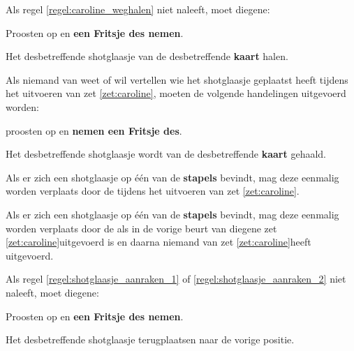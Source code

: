 \vervolgLijst{}
\item Als \eenSpeler regel \ref{regel:caroline_weghalen} niet naleeft, moet diegene:
\puntLijst{}
\item Proosten op  en \textbf{een Fritsje des nemen}\footnotemark[3].
\item Het desbetreffende shotglaasje van de desbetreffende \textbf{kaart} halen.
\eindPuntLijst{}
\eindLijst{}

\vervolgLijst{}
\item Als niemand van \alleSpelers weet of wil vertellen wie het shotglaasje geplaatst heeft tijdens het uitvoeren van zet \ref{zet:caroline}\footnotemark[1], moeten de volgende handelingen uitgevoerd worden:
\puntLijst{}
\item \AlleSpelers proosten op  en \textbf{nemen een Fritsje des}\footnotemark[3].
\item Het desbetreffende shotglaasje wordt van de desbetreffende \textbf{kaart} gehaald.
\eindPuntLijst{}
\eindLijst{}


\vervolgLijst{}
\item \label{regel:shotglaasje_aanraken_1} Als er zich een shotglaasje op \'e\'en van de \textbf{stapels} bevindt, mag deze eenmalig worden verplaats door de \huidigeSpeler tijdens het uitvoeren van zet \ref{zet:caroline}\footnotemark[1].
\eindLijst{}

\vervolgLijst{}
\item \label{regel:shotglaasje_aanraken_2} Als er zich een shotglaasje op \'e\'en van de \textbf{stapels} bevindt, mag deze eenmalig worden verplaats door de \huidigeSpeler als in de vorige beurt van diegene zet \ref{zet:caroline}\footnotemark[1] uitgevoerd is en daarna niemand van \alleSpelers zet \ref{zet:caroline}\footnotemark[2] heeft uitgevoerd.
\eindLijst{}

\vervolgLijst{}
\item Als \eenSpeler regel \ref{regel:shotglaasje_aanraken_1} of \ref{regel:shotglaasje_aanraken_2} niet naleeft, moet diegene:
\puntLijst{}
\item Proosten op  en \textbf{een Fritsje des nemen}\footnotemark[3].
\item Het desbetreffende shotglaasje terugplaatsen naar de vorige positie.
\eindPuntLijst{}
\eindLijst{}


